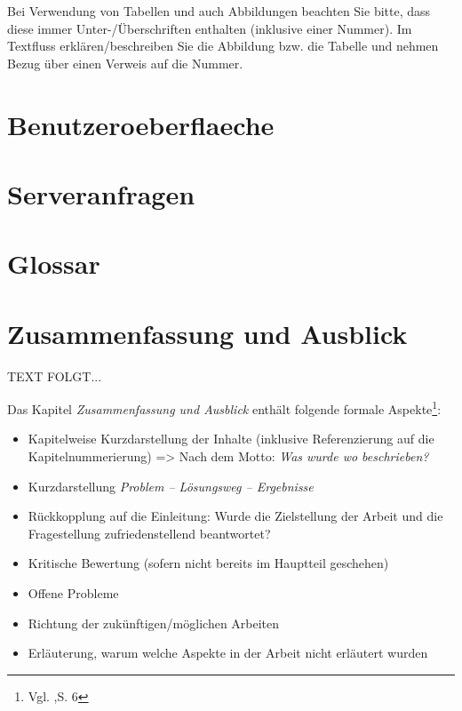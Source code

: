 \documentclass[a4paper,12pt,oneside]{article}
\begin{document}
    \vspace{1cm}
 \begin{tcolorbox}[title={Abbildungen, Tabellen \& Co.}]
Bei Verwendung von Tabellen und auch Abbildungen beachten Sie bitte, dass diese immer Unter-/Überschriften enthalten (inklusive einer Nummer). Im Textfluss erklären/beschreiben Sie die Abbildung bzw. die Tabelle und nehmen Bezug über einen Verweis auf die Nummer.
  \end{tcolorbox}
  
  \newpage  
  \section{Benutzeroeberflaeche}\label{kap_benutzeroeberflaeche}
  
  
  \newpage  
  \section{Serveranfragen}\label{kap_serveranfragen }
  
 
  \newpage  
  \section{Glossar}\label{kap_glossar}
  
 

  \newpage 
  \section{Zusammenfassung und Ausblick}\label{kap_zusammfAusbl}  
   TEXT FOLGT...
   
    \vspace{1cm}
 \begin{tcolorbox}[title={Inhalte der \textit{Zusammenfassung und Ausblick}}]
Das Kapitel \textit{Zusammenfassung und Ausblick} enthält folgende formale Aspekte\footnote{Vgl. \cite{BBoJ},S. 6}:
\begin{itemize}
\item Kapitelweise Kurzdarstellung der Inhalte (inklusive Referenzierung auf die Kapitelnummerierung) => Nach dem Motto: \textit{Was wurde wo beschrieben?}
\item Kurzdarstellung \textit{Problem – Lösungsweg – Ergebnisse}
\item Rückkopplung auf die Einleitung: Wurde die Zielstellung der Arbeit und die Fragestellung zufriedenstellend beantwortet?
\item Kritische Bewertung (sofern nicht bereits im Hauptteil geschehen)
\item Offene Probleme
\item Richtung der zukünftigen/möglichen Arbeiten
\item Erläuterung, warum welche Aspekte in der Arbeit nicht erläutert wurden
\end{itemize}
  \end{tcolorbox}
   
\end{document}
